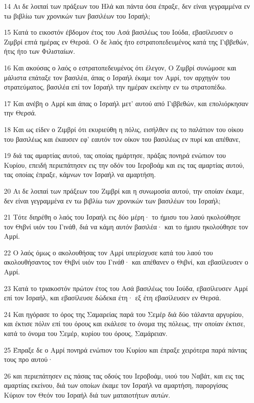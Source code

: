 \par 14 Αι δε λοιπαί των πράξεων του Ηλά και πάντα όσα έπραξε, δεν είναι γεγραμμένα εν τω βιβλίω των χρονικών των βασιλέων του Ισραήλ;
\par 15 Κατά το εικοστόν έβδομον έτος του Ασά βασιλέως του Ιούδα, εβασίλευσεν ο Ζιμβρί επτά ημέρας εν Θερσά. Ο δε λαός ήτο εστρατοπεδευμένος κατά της Γιββεθών, ήτις ήτο των Φιλισταίων.
\par 16 Και ακούσας ο λαός ο εστρατοπεδευμένος ότι έλεγον, Ο Ζιμβρί συνώμοσε και μάλιστα επάταξε τον βασιλέα, άπας ο Ισραήλ έκαμε τον Αμρί, τον αρχηγόν του στρατεύματος, βασιλέα επί τον Ισραήλ την ημέραν εκείνην εν τω στρατοπέδω.
\par 17 Και ανέβη ο Αμρί και άπας ο Ισραήλ μετ' αυτού από Γιββεθών, και επολιόρκησαν την Θερσά.
\par 18 Και ως είδεν ο Ζιμβρί ότι εκυριεύθη η πόλις, εισήλθεν εις το παλάτιον του οίκου του βασιλέως και έκαυσεν εφ' εαυτόν τον οίκον του βασιλέως εν πυρί και απέθανε,
\par 19 διά τας αμαρτίας αυτού, τας οποίας ημάρτησε, πράξας πονηρά ενώπιον του Κυρίου, επειδή περιεπάτησεν εις την οδόν του Ιεροβοάμ και εις τας αμαρτίας αυτού, τας οποίας έπραξε, κάμνων τον Ισραήλ να αμαρτήση.
\par 20 Αι δε λοιπαί των πράξεων του Ζιμβρί και η συνωμοσία αυτού, την οποίαν έκαμε, δεν είναι γεγραμμένα εν τω βιβλίω των χρονικών των βασιλέων του Ισραήλ;
\par 21 Τότε διηρέθη ο λαός του Ισραήλ εις δύο μέρη· το ήμισυ του λαού ηκολούθησε τον Θιβνί υιόν του Γινάθ, διά να κάμη αυτόν βασιλέα· και το ήμισυ ηκολούθησε τον Αμρί.
\par 22 Ο λαός όμως ο ακολουθήσας τον Αμρί υπερίσχυσε κατά του λαού του ακολουθήσαντος τον Θιβνί υιόν του Γινάθ· και απέθανεν ο Θιβνί, και εβασίλευσεν ο Αμρί.
\par 23 Κατά το τριακοστόν πρώτον έτος του Ασά βασιλέως του Ιούδα, εβασίλευσεν Αμρί επί τον Ισραήλ, και εβασίλευσε δώδεκα έτη· εξ έτη εβασίλευσεν εν Θερσά.
\par 24 Και ηγόρασε το όρος της Σαμαρείας παρά του Σεμέρ διά δύο τάλαντα αργυρίου, και έκτισε πόλιν επί του όρους και εκάλεσε το όνομα της πόλεως, την οποίαν έκτισε, κατά το όνομα του Σεμέρ, κυρίου του όρους, Σαμάρειαν.
\par 25 Έπραξε δε ο Αμρί πονηρά ενώπιον του Κυρίου και έπραξε χειρότερα παρά πάντας τους προ αυτού·
\par 26 και περιεπάτησεν εις πάσας τας οδούς του Ιεροβοάμ, υιού του Ναβάτ, και εις τας αμαρτίας εκείνου, διά των οποίων έκαμε τον Ισραήλ να αμαρτήση, παροργίσας Κύριον τον Θεόν του Ισραήλ διά των ματαιοτήτων αυτών.
